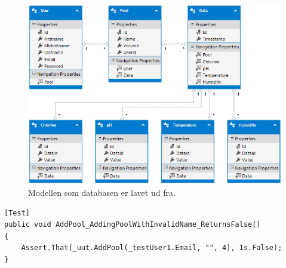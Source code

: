\begin{figure}[H]
\centering
\includegraphics[width=\linewidth]{figs/db_model}
\caption{Modellen som databasen er lavet ud fra.}
\label{fig:dbmodel}
\end{figure}

\vskip5cm

\begin{lstlisting}[caption=Eksempel på unittest af db.,label=code:test]
[Test]
public void AddPool_AddingPoolWithInvalidName_ReturnsFalse()
{
	Assert.That(_uut.AddPool(_testUser1.Email, "", 4), Is.False);
}
\end{lstlisting}